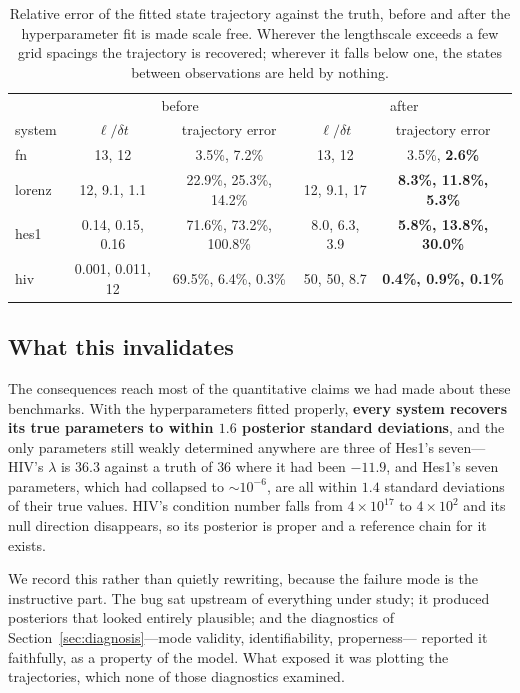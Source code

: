 \documentclass[11pt]{article}
\theoremstyle{plain}
\theoremstyle{definition}
\theoremstyle{remark}
\begin{document}
\begin{table}[t]
\centering\small
\begin{tabular}{lcccc}
\toprule
& \multicolumn{2}{c}{before} & \multicolumn{2}{c}{after}\\
system & $\ell/\delta t$ & trajectory error & $\ell/\delta t$ & trajectory error\\
\midrule
fn     & 13, 12 & 3.5\%, 7.2\% & 13, 12 & 3.5\%, \textbf{2.6\%}\\
lorenz & 12, 9.1, 1.1 & 22.9\%, 25.3\%, 14.2\% & 12, 9.1, 17 & \textbf{8.3\%, 11.8\%, 5.3\%}\\
hes1   & 0.14, 0.15, 0.16 & 71.6\%, 73.2\%, 100.8\% & 8.0, 6.3, 3.9 & \textbf{5.8\%, 13.8\%, 30.0\%}\\
hiv    & 0.001, 0.011, 12 & 69.5\%, 6.4\%, 0.3\% & 50, 50, 8.7 & \textbf{0.4\%, 0.9\%, 0.1\%}\\
\bottomrule
\end{tabular}
\caption{Relative error of the fitted state trajectory against the truth, before and after the
hyperparameter fit is made scale free. Wherever the lengthscale exceeds a few grid spacings the
trajectory is recovered; wherever it falls below one, the states between observations are held by
nothing.}
\label{tab:gp}
\end{table}

\subsection{What this invalidates}

The consequences reach most of the quantitative claims we had made about these benchmarks. With
the hyperparameters fitted properly, \textbf{every system recovers its true parameters to within
$1.6$ posterior standard deviations}, and the only parameters still weakly determined anywhere are
three of Hes1's seven---HIV's $\lambda$ is $36.3$
against a truth of $36$ where it had been $-11.9$, and Hes1's seven parameters, which had collapsed
to $\sim\!10^{-6}$, are all within $1.4$ standard deviations of their true values. HIV's condition
number falls from $4\times10^{17}$ to $4\times10^{2}$ and its null direction disappears, so its
posterior is proper and a reference chain for it exists.

We record this rather than quietly rewriting, because the failure mode is the instructive part. The
bug sat upstream of everything under study; it produced posteriors that looked entirely plausible;
and the diagnostics of Section~\ref{sec:diagnosis}---mode validity, identifiability, properness---
reported it faithfully, as a property of the model. What exposed it was plotting the trajectories,
which none of those diagnostics examined.
\end{document}
